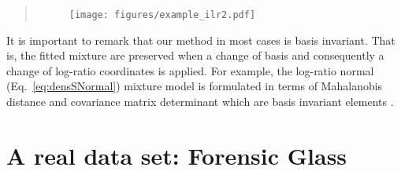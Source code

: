 \documentclass[10pt, a4paper]{article}
\begin{document}
\begin{quote}
\begin{figure}[thbp]
\centering
\texttt{[image: figures/example\_ilr2.pdf]}
\caption{}\label{example_ilr2}
\end{figure}
% 

\end{quote}



% 

It is important to remark that our method in most cases is basis invariant. That is, the fitted mixture are preserved when a change of basis and consequently a change of log-ratio coordinates is applied. For example, the log-ratio normal (Eq.~\ref{eq:densSNormal}) mixture model is formulated in terms of Mahalanobis distance and covariance matrix determinant which are basis invariant elements
 \citep{barcelo1999comment}.

 

\section{A real data set: Forensic Glass}
\label{example_section}
\end{document}

